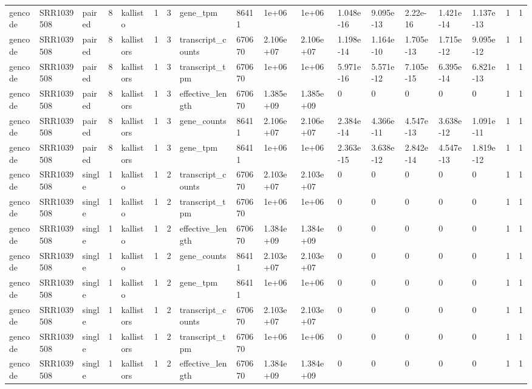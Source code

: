 \begin{tabular}{llllllllllllllllll}
gencode & SRR1039508 & paired & 8 & kallisto & 1 & 3 & gene\_tpm & 86411 & 1e+06 & 1e+06 & 1.048e-16 & 9.095e-13 & 2.22e-16 & 1.421e-14 & 1.137e-13 & 1 & 1 \\
gencode & SRR1039508 & paired & 8 & kallistors & 1 & 3 & transcript\_counts & 670670 & 2.106e+07 & 2.106e+07 & 1.198e-14 & 1.164e-10 & 1.705e-13 & 1.715e-12 & 9.095e-12 & 1 & 1 \\
gencode & SRR1039508 & paired & 8 & kallistors & 1 & 3 & transcript\_tpm & 670670 & 1e+06 & 1e+06 & 5.971e-16 & 5.571e-12 & 7.105e-15 & 6.395e-14 & 6.821e-13 & 1 & 1 \\
gencode & SRR1039508 & paired & 8 & kallistors & 1 & 3 & effective\_length & 670670 & 1.385e+09 & 1.385e+09 & 0 & 0 & 0 & 0 & 0 & 1 & 1 \\
gencode & SRR1039508 & paired & 8 & kallistors & 1 & 3 & gene\_counts & 86411 & 2.106e+07 & 2.106e+07 & 2.384e-14 & 4.366e-11 & 4.547e-13 & 3.638e-12 & 1.091e-11 & 1 & 1 \\
gencode & SRR1039508 & paired & 8 & kallistors & 1 & 3 & gene\_tpm & 86411 & 1e+06 & 1e+06 & 2.363e-15 & 3.638e-12 & 2.842e-14 & 4.547e-13 & 1.819e-12 & 1 & 1 \\
gencode & SRR1039508 & single & 1 & kallisto & 1 & 2 & transcript\_counts & 670670 & 2.103e+07 & 2.103e+07 & 0 & 0 & 0 & 0 & 0 & 1 & 1 \\
gencode & SRR1039508 & single & 1 & kallisto & 1 & 2 & transcript\_tpm & 670670 & 1e+06 & 1e+06 & 0 & 0 & 0 & 0 & 0 & 1 & 1 \\
gencode & SRR1039508 & single & 1 & kallisto & 1 & 2 & effective\_length & 670670 & 1.384e+09 & 1.384e+09 & 0 & 0 & 0 & 0 & 0 & 1 & 1 \\
gencode & SRR1039508 & single & 1 & kallisto & 1 & 2 & gene\_counts & 86411 & 2.103e+07 & 2.103e+07 & 0 & 0 & 0 & 0 & 0 & 1 & 1 \\
gencode & SRR1039508 & single & 1 & kallisto & 1 & 2 & gene\_tpm & 86411 & 1e+06 & 1e+06 & 0 & 0 & 0 & 0 & 0 & 1 & 1 \\
gencode & SRR1039508 & single & 1 & kallistors & 1 & 2 & transcript\_counts & 670670 & 2.103e+07 & 2.103e+07 & 0 & 0 & 0 & 0 & 0 & 1 & 1 \\
gencode & SRR1039508 & single & 1 & kallistors & 1 & 2 & transcript\_tpm & 670670 & 1e+06 & 1e+06 & 0 & 0 & 0 & 0 & 0 & 1 & 1 \\
gencode & SRR1039508 & single & 1 & kallistors & 1 & 2 & effective\_length & 670670 & 1.384e+09 & 1.384e+09 & 0 & 0 & 0 & 0 & 0 & 1 & 1 \\

\end{tabular}
